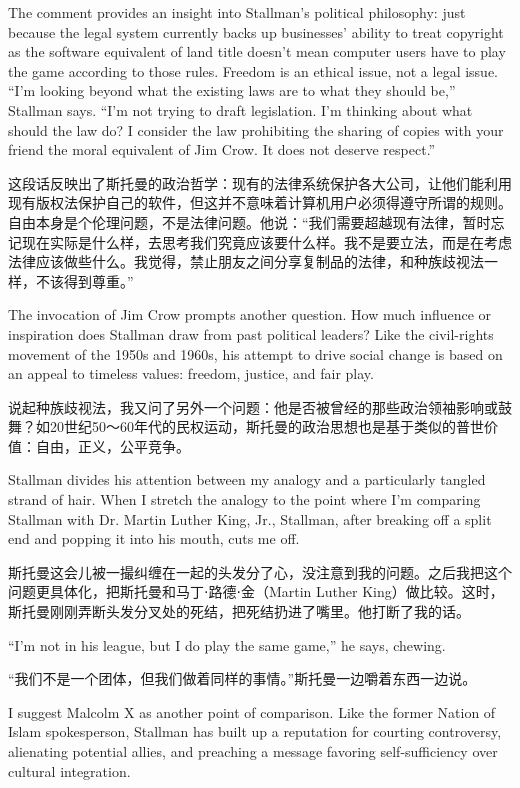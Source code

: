 \ifdefined\eng
The comment provides an insight into Stallman's political philosophy: just because the legal system currently backs up businesses' ability to treat copyright as the software equivalent of land title doesn't mean computer users have to play the game according to those rules. Freedom is an ethical issue, not a legal issue. ``I'm looking beyond what the existing laws are to what they should be,'' Stallman says. ``I'm not trying to draft legislation. I'm thinking about what should the law do? I consider the law prohibiting the sharing of copies with your friend the moral equivalent of Jim Crow. It does not deserve respect.''
\fi

\ifdefined\chs
这段话反映出了斯托曼的政治哲学：现有的法律系统保护各大公司，让他们能利用现有版权法保护自己的软件，但这并不意味着计算机用户必须得遵守所谓的规则。自由本身是个伦理问题，不是法律问题。他说：``我们需要超越现有法律，暂时忘记现在实际是什么样，去思考我们究竟应该要什么样。我不是要立法，而是在考虑法律应该做些什么。我觉得，禁止朋友之间分享复制品的法律，和种族歧视法一样，不该得到尊重。''
\fi

\ifdefined\eng
The invocation of Jim Crow prompts another question. How much influence or inspiration does Stallman draw from past political leaders? Like the civil-rights movement of the 1950s and 1960s, his attempt to drive social change is based on an appeal to timeless values: freedom, justice, and fair play.
\fi

\ifdefined\chs
说起种族歧视法，我又问了另外一个问题：他是否被曾经的那些政治领袖影响或鼓舞？如20世纪50～60年代的民权运动，斯托曼的政治思想也是基于类似的普世价值：自由，正义，公平竞争。
\fi

\ifdefined\eng
Stallman divides his attention between my analogy and a particularly tangled strand of hair. When I stretch the analogy to the point where I'm comparing Stallman with Dr. Martin Luther King, Jr., Stallman, after breaking off a split end and popping it into his mouth, cuts me off.
\fi

\ifdefined\chs
斯托曼这会儿被一撮纠缠在一起的头发分了心，没注意到我的问题。之后我把这个问题更具体化，把斯托曼和马丁⋅路德⋅金（Martin Luther King）做比较。这时，斯托曼刚刚弄断头发分叉处的死结，把死结扔进了嘴里。他打断了我的话。
\fi

\ifdefined\eng
``I'm not in his league, but I do play the same game,'' he says, chewing.
\fi

\ifdefined\chs
``我们不是一个团体，但我们做着同样的事情。''斯托曼一边嚼着东西一边说。
\fi

\ifdefined\eng
I suggest Malcolm X as another point of comparison. Like the former Nation of Islam spokesperson, Stallman has built up a reputation for courting controversy, alienating potential allies, and preaching a message favoring self-sufficiency over cultural integration.
\fi

